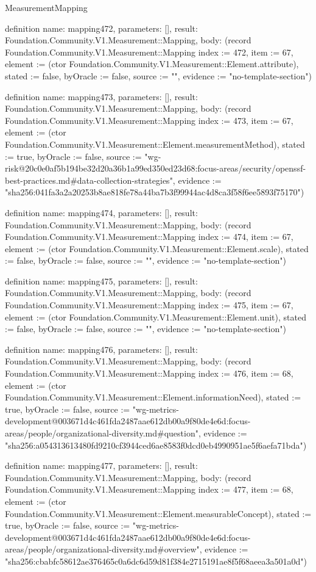 \begin{lexlean}{MeasurementMapping}
\begin{semanticmodule}
definition{
  name: mapping472,
  parameters: [],
  result: Foundation.Community.V1.Measurement::Mapping,
  body: (record Foundation.Community.V1.Measurement::Mapping {index := 472, item := 67, element := (ctor Foundation.Community.V1.Measurement::Element.attribute), stated := false, byOracle := false, source := "", evidence := "no-template-section"})
}

definition{
  name: mapping473,
  parameters: [],
  result: Foundation.Community.V1.Measurement::Mapping,
  body: (record Foundation.Community.V1.Measurement::Mapping {index := 473, item := 67, element := (ctor Foundation.Community.V1.Measurement::Element.measurementMethod), stated := true, byOracle := false, source := "wg-risk@20c0e0af5b194be32d20a36b1a99ed350ed23d68:focus-areas/security/openssf-best-practices.md#data-collection-strategies", evidence := "sha256:041fa3a2a20253b8ae818fe78a44ba7b3f99944ac4d8ca3f58f6ee5893f75170"})
}

definition{
  name: mapping474,
  parameters: [],
  result: Foundation.Community.V1.Measurement::Mapping,
  body: (record Foundation.Community.V1.Measurement::Mapping {index := 474, item := 67, element := (ctor Foundation.Community.V1.Measurement::Element.scale), stated := false, byOracle := false, source := "", evidence := "no-template-section"})
}

definition{
  name: mapping475,
  parameters: [],
  result: Foundation.Community.V1.Measurement::Mapping,
  body: (record Foundation.Community.V1.Measurement::Mapping {index := 475, item := 67, element := (ctor Foundation.Community.V1.Measurement::Element.unit), stated := false, byOracle := false, source := "", evidence := "no-template-section"})
}

definition{
  name: mapping476,
  parameters: [],
  result: Foundation.Community.V1.Measurement::Mapping,
  body: (record Foundation.Community.V1.Measurement::Mapping {index := 476, item := 68, element := (ctor Foundation.Community.V1.Measurement::Element.informationNeed), stated := true, byOracle := false, source := "wg-metrics-development@003671d4c461fda2487aae612db00a9f80de4e6d:focus-areas/people/organizational-diversity.md#question", evidence := "sha256:a054313613480fd9210cf3944ced6ae8583f0dcd0eb4990951ae5f6aefa71bda"})
}

definition{
  name: mapping477,
  parameters: [],
  result: Foundation.Community.V1.Measurement::Mapping,
  body: (record Foundation.Community.V1.Measurement::Mapping {index := 477, item := 68, element := (ctor Foundation.Community.V1.Measurement::Element.measurableConcept), stated := true, byOracle := false, source := "wg-metrics-development@003671d4c461fda2487aae612db00a9f80de4e6d:focus-areas/people/organizational-diversity.md#overview", evidence := "sha256:cbabfc58612ae376465c0a6dc6d59d81f384e2715191ae8f5f68aeea3a501a0d"})
}


\end{semanticmodule}
\end{lexlean}
